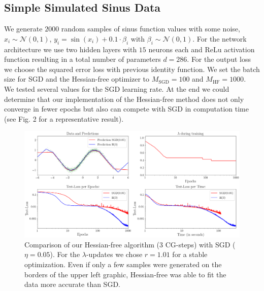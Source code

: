 \documentclass[conference]{IEEEtran}
\begin{document}
	\subsection{Simple Simulated Sinus Data}
	\noindent
	We generate $2000$ random samples of sinus function values with some noise, $x_{i}\sim\mathcal{N}(0, 1)$, $y_{i}=\sin(x_{i})+0.1\cdot\beta_{i}$ with  $\beta_{i}\sim\mathcal{N}(0,1)$. For the network architecture we use two hidden layers with $15$ neurons each and ReLu activation function resulting in a total number of parameters $d=286$. For the output loss we choose the squared error loss with previous identity function. We set the batch size for SGD and the Hessian-free optimizer to $M_{\mathrm{SGD}}=100$ and $M_{\mathrm{HF}}=1000$.\\
	We tested several values for the SGD learning rate. At the end we could determine that our implementation of the Hessian-free method does not only converge in fewer epochs but also can compete with SGD in computation time (see Fig. 2 for a representative result).


	\begin{figure}[tb]
		\centering
		\includegraphics[width=\textwidth]{toy_005.png}
		\caption{Comparison of our Hessian-free algorithm (3 CG-steps) with SGD ($\eta=0.05$). For the $\lambda$-updates we chose $r=1.01$ for a stable optimization. Even if only a few samples were generated on the borders of the upper left graphic, Hessian-free was able to fit the data more accurate than SGD.}
		\label{fig2}
	\end{figure}
\end{document}
